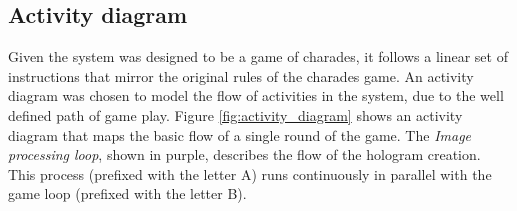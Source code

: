 \newpage

\subsection{Activity diagram}

\begin{figure}[h!]
\end{figure}

Given the system was designed to be a game of charades, it follows a linear set of instructions that mirror the original rules of the charades game. An activity diagram was chosen to model the flow of activities in the system, due to the well defined path of game play. Figure \ref{fig:activity_diagram} shows an activity diagram that maps the basic flow of a single round of the game. The \textit{Image processing loop}, shown in purple, describes the flow  of the hologram creation. This process (prefixed with the letter A) runs continuously in parallel with the game loop (prefixed with the letter B).

